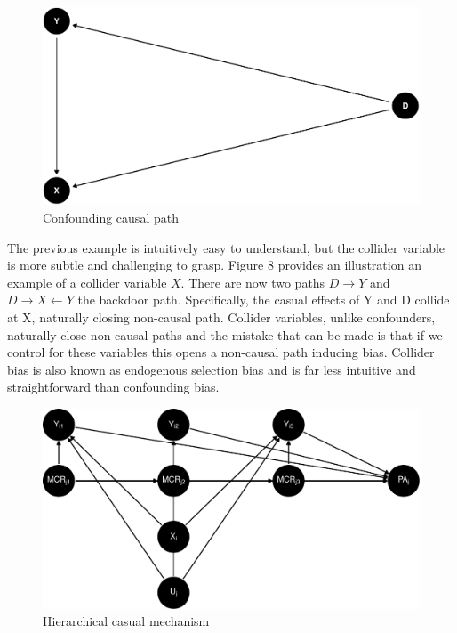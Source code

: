 \documentclass[
  10pt,
]{article}
\begin{document}
\begin{figure}[H]
\includegraphics{figures/paper-unnamed-chunk-3-1} \caption{Confounding causal path}\label{fig:unnamed-chunk-3}
\end{figure}

The previous example is intuitively easy to understand, but the collider
variable is more subtle and challenging to grasp. Figure 8 provides an
illustration an example of a collider variable \(X\). There are now two
paths \(D \rightarrow Y\) and \(D \rightarrow X \leftarrow Y\) the
backdoor path. Specifically, the casual effects of Y and D collide at X,
naturally closing non-causal path. Collider variables, unlike
confounders, naturally close non-causal paths and the mistake that can
be made is that if we control for these variables this opens a
non-causal path inducing bias. Collider bias is also known as endogenous
selection bias and is far less intuitive and straightforward than
confounding bias.

\begin{figure}[H]
\includegraphics{figures/paper-panel_dag-1} \caption{Hierarchical casual mechanism}\label{fig:panel_dag}
\end{figure}
\end{document}
